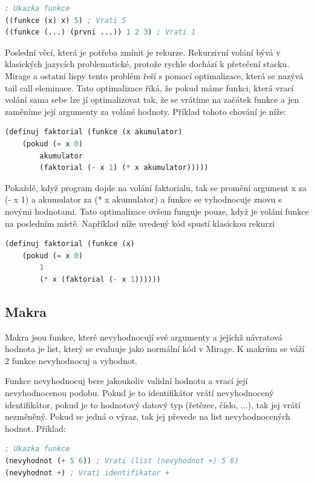 \documentclass[a4paper,11pt]{article}
\begin{document}
\begin{lstlisting}[language=lisp]
; Ukazka funkce
((funkce (x) x) 5) ; Vrati 5
((funkce (...) (prvni ...)) 1 2 3) ; Vrati 1
\end{lstlisting}

Poslední věcí, která je potřeba zmínit je rekurze. Rekurzivní volání bývá v klasických jazycích problematické, protože rychle dochází k přetečení stacku. Mirage a ostatní lispy tento problém řeší s pomocí optimalizace, která se nazývá tail call eleminace. Tato optimalizace říká, že pokud máme funkci, která vrací volání sama sebe lze jí optimalizovat tak, že se vrátíme na začátek funkce a jen zaměníme její argumenty za voláné hodnoty. Příklad tohoto chování je níže:

\begin{lstlisting}[language=lisp]
(definuj faktorial (funkce (x akumulator)
	(pokud (= x 0)
		akumulator
		(faktorial (- x 1) (* x akumulator)))))
\end{lstlisting}

Pokaždé, když program dojde na volání faktorialu, tak se promění argument x za (- x 1) a akumulator za (* x akumulator) a funkce se vyhodnocuje znovu s novými hodnotami. Tato optimalizace ovšem funguje pouze, když je volání funkce na posledním místě. Například níže uvedený kód spustí klasickou rekurzi

\begin{lstlisting}[language=lisp]
(definuj faktorial (funkce (x)
	(pokud (= x 0)
		1
		(* x (faktorial (- x 1))))))
\end{lstlisting}

\subsection{Makra}
Makra jsou funkce, které nevyhodnocují své argumenty a jejíchž návratová hodnota je list, který se evaluuje jako normální kód v Mirage. K makrům se váží 2 funkce nevyhodnocuj a vyhodnot.

Funkce nevyhodnocuj bere jakoukoliv validní hodnotu a vrací její nevyhodnocenou podobu. Pokud je to identifikátor vrátí nevyhodnocený identifikátor, pokud je to hodnotový datový typ (řetězec, číslo, ...), tak jej vrátí nezměněný. Pokud se jedná o výraz, tak jej převede na list nevyhodnocených hodnot. Příklad:

\begin{lstlisting}[language=lisp]
; Ukazka funkce
(nevyhodnot (+ 5 6)) ; Vrati (list (nevyhodnot +) 5 6)
(nevyhodnot +) ; Vrati identifikator +
\end{lstlisting}
\end{document}
